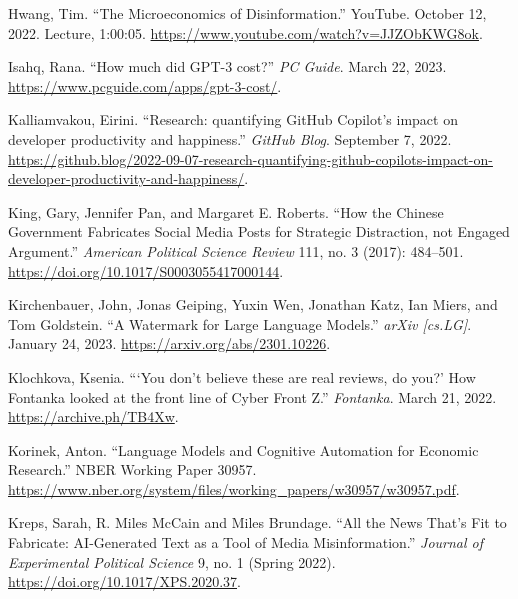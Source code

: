 \documentclass{article}
\begin{document}
\begin{thebibliography}{9}
  Hwang, Tim. ``The Microeconomics of Disinformation.'' YouTube. October 12, 2022. Lecture, 1:00:05. \href{https://www.youtube.com/watch?v=JJZObKWG8ok}{https://www.youtube.com/watch?v=JJZObKWG8ok}.

  Isahq, Rana. ``How much did GPT-3 cost?'' \textit{PC Guide}. March 22, 2023. \href{https://www.pcguide.com/apps/gpt-3-cost/}{https://www.pcguide.com/apps/gpt-3-cost/}. 

  Kalliamvakou, Eirini. ``Research: quantifying GitHub Copilot's impact on developer productivity and happiness.'' \textit{GitHub Blog}. September 7, 2022. \href{https://github.blog/2022-09-07-research-quantifying-github-copilots-impact-on-developer-productivity-and-happiness/}{https://github.blog/2022-09-07-research-quantifying-github-copilots-impact-on-developer-productivity-and-happiness/}. 

  King, Gary, Jennifer Pan, and Margaret E. Roberts. ``How the Chinese Government Fabricates Social Media Posts for Strategic Distraction, not Engaged Argument.'' \textit{American Political Science Review} 111, no. 3 (2017): 484–501. \href{https://doi.org/10.1017/S0003055417000144}{https://doi.org/10.1017/S0003055417000144}. 

  Kirchenbauer, John, Jonas Geiping, Yuxin Wen, Jonathan Katz, Ian Miers, and Tom Goldstein. ``A Watermark for Large Language Models.'' \textit{arXiv [cs.LG]}. January 24, 2023. \href{https://arxiv.org/abs/2301.10226}{https://arxiv.org/abs/2301.10226}. 

  Klochkova, Ksenia. ```You don't believe these are real reviews, do you?' How Fontanka looked at the front line of Cyber Front Z.'' \textit{Fontanka}. March 21, 2022. \href{https://archive.ph/TB4Xw}{https://archive.ph/TB4Xw}.

  Korinek, Anton. ``Language Models and Cognitive Automation for Economic Research.'' NBER Working Paper 30957. \href{https://www.nber.org/system/files/working_papers/w30957/w30957.pdf}{https://www.nber.org/system/files/working\_papers/w30957/w30957.pdf}. 

  Kreps, Sarah, R. Miles McCain and Miles Brundage. ``All the News That's Fit to Fabricate: AI-Generated Text as a Tool of Media Misinformation.'' \textit{Journal of Experimental Political Science} 9, no. 1 (Spring 2022). \href{https://doi.org/10.1017/XPS.2020.37}{https://doi.org/10.1017/XPS.2020.37}.


\end{thebibliography}
\end{document}
